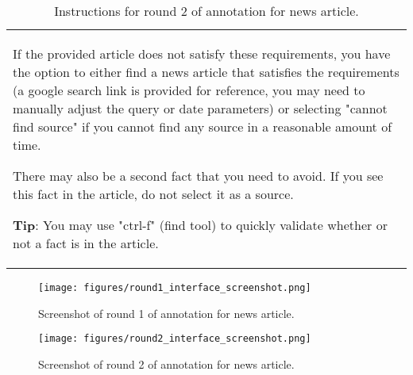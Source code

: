 \begin{table*}[]
\begin{tabular}{p{15cm}}
If the provided article does not satisfy these requirements, you have the option to either find a news article that satisfies the requirements (a google search link is provided for reference, you may need to manually adjust the query or date parameters) or selecting "cannot find source" if you cannot find any source in a reasonable amount of time.

There may also be a second fact that you need to avoid. If you see this fact in the article, do not select it as a source.

\textbf{Tip}: You may use "ctrl-f" (find tool) to quickly validate whether or not a fact is in the article.

    \end{tabular}
    \caption{Instructions for round 2 of annotation for news article.}
    \label{tab:annotator_instructions_2}
\end{table*}

\begin{figure*}
    \centering
    \texttt{[image: figures/round1\_interface\_screenshot.png]}
    \caption{Screenshot of round 1 of annotation for news article.}
    \label{fig:annotator_screenshot_1}
\end{figure*}

\begin{figure*}
    \centering
    \texttt{[image: figures/round2\_interface\_screenshot.png]}
    \caption{Screenshot of round 2 of annotation for news article.}
    \label{fig:annotator_screenshot_2}
\end{figure*}

